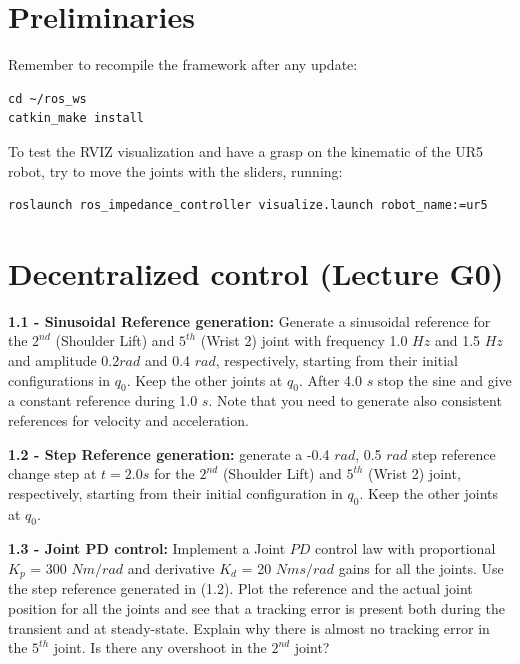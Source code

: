\documentclass[11pt]{article}
\begin{document}
\section{Preliminaries}

Remember to recompile the framework after any update:

\begin{verbatim}
cd ~/ros_ws
catkin_make install
\end{verbatim}

To test the RVIZ visualization and have a grasp on the kinematic of the UR5 robot, try to move the joints with the sliders, running:
%
\begin{verbatim}
roslaunch ros_impedance_controller visualize.launch robot_name:=ur5 
\end{verbatim}

\section{Decentralized control (Lecture G0)}

\noindent
\textbf{1.1 - Sinusoidal Reference generation:}
 Generate a sinusoidal reference for the $2^{nd}$ (Shoulder Lift) and $5^{th}$  (Wrist 2) joint with frequency 1.0 $Hz$ and 1.5 $Hz$ and amplitude 0.2$rad$ and 0.4 $rad$, respectively,  starting from their initial configurations in $q_0$. Keep the other joints at $q_0$. After 4.0 $s$ stop the sine and give a constant reference during  1.0 $s$. Note that you need to generate also consistent references for velocity and acceleration.

\quad

\noindent
\textbf{1.2 - Step Reference generation:} generate a -0.4 $rad$, 0.5 $rad$ step reference change step at $t= 2.0s$ for the $2^{nd}$ (Shoulder Lift) and $5^{th}$  (Wrist 2) joint, respectively, starting from their initial configuration in $q_0$. Keep the other joints at $q_0$.

\quad

\noindent
\textbf{1.3 - Joint PD control:}
Implement a Joint $PD$ control law with proportional $K_p$ = 300 $Nm/rad$ and derivative $K_d$ = 20 $Nms/rad$ gains for all the joints. Use the step reference generated in (1.2). Plot the reference and the actual joint position for all the joints and see that a tracking error is present both during the transient and at steady-state. Explain why there is almost no tracking error in the $5^{th}$ joint. %
Is there any overshoot in the $2^{nd}$ joint? 
\end{document}

